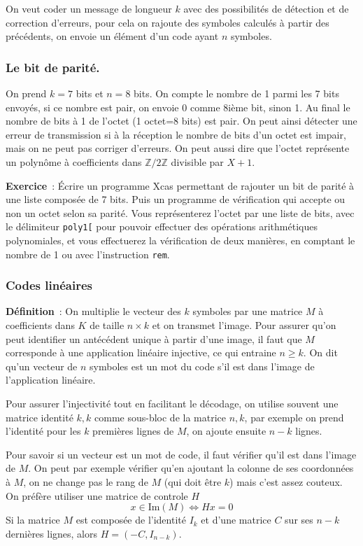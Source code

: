 \documentclass[a4paper,11pt]{article}
\newcommand{\Z}{{\mathbb{Z}}}
\begin{document}
\begin{giacjshere}
On veut coder un message de longueur $k$ avec des possibilit\'es
de d\'etection et de correction d'erreurs, pour cela on rajoute
des symboles calcul\'es \`a partir des pr\'ec\'edents, 
on envoie un \'el\'ement d'un code ayant $n$ symboles.

\subsubsection{Le bit de parit\'e.}
On prend $k=7$ bits et $n=8$ bits. On compte
le nombre de 1 parmi les 7 bits envoy\'es, si ce nombre est pair, 
on envoie 0 comme 8i\`eme bit, sinon 1. 
Au final le nombre de bits \`a 1 de l'octet (1 octet=8 bits)
est pair. On peut ainsi d\'etecter une erreur de transmission si
\`a la r\'eception le nombre de bits d'un octet est impair, mais on
ne peut pas corriger d'erreurs.
On peut aussi dire que l'octet
repr\'esente un polyn\^ome \`a coefficients dans $\Z/2\Z$ divisible
par $X+1$.

{\bf Exercice}~:
\'Ecrire un programme Xcas permettant de rajouter un bit de parité
à une liste composée de 7 bits. Puis un programme de vérification
qui accepte ou non un octet selon sa parité. Vous représenterez
l'octet par une liste de bits, avec le délimiteur \verb|poly1[|
pour pouvoir effectuer des opérations arithmétiques polynomiales,
et vous effectuerez la vérification de deux manières, en comptant
le nombre de 1 ou avec l'instruction \verb|rem|.

\subsubsection{Codes lin\'eaires}
{\bf D\'efinition}~:
On multiplie le vecteur des $k$ symboles par
une matrice $M$ à coefficients dans $K$ de taille $n \times k$
et on transmet l'image.
Pour assurer qu'on peut identifier un antécédent
unique à partir d'une image, il faut que $M$ corresponde 
à une application linéaire injective, ce qui entraine $n\geq k$. 
On dit qu'un vecteur de $n$ symboles est un mot du code 
s'il est dans l'image de l'application lin\'eaire.

Pour assurer l'injectivité tout en facilitant le décodage, 
on utilise souvent une matrice identité $k,k$ comme sous-bloc
de la matrice $n,k$, par exemple on prend l'identité pour
les $k$ premières lignes de $M$, on ajoute ensuite $n-k$ lignes.

Pour savoir si un vecteur est un mot de code, il faut vérifier
qu'il est dans l'image de $M$. On peut par exemple vérifier
qu'en ajoutant la colonne de ses coordonnées à $M$, on ne change
pas le rang de $M$ (qui doit être $k$) mais c'est assez couteux.
On pr\'ef\`ere utiliser une matrice de controle $H$
$$ x \in \mbox{Im}(M) \Leftrightarrow Hx=0$$
Si la matrice $M$ est compos\'ee de l'identit\'e $I_{k}$
et d'une matrice $C$ sur ses $n-k$ derni\`eres lignes, 
alors $H=(-C,I_{n-k})$.


\end{giacjshere}
\end{document}
